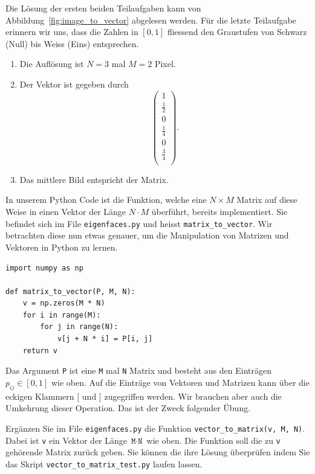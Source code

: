\begin{losung*}
	Die Lösung der ersten beiden Teilaufgaben kann von Abbildung~\ref{fig:image_to_vector} abgelesen werden.
	Für die letzte Teilaufgabe erinnern wir uns, dass die Zahlen in $\left[0,1\right]$ fliessend den Graustufen von Schwarz (Null) bis Weiss (Eins) entsprechen.
	\begin{enumerate}[label=(\alph*)]
		\item Die Auflösung ist $N=3$ mal $M=2$ Pixel.
		\item Der Vektor ist gegeben durch
		\begin{equation*}
			\begin{pmatrix}
				1 \\
				\frac{1}{2} \\
				0 \\
				\frac{1}{4} \\
				0 \\
				\frac{3}{4} \\
			\end{pmatrix}.
		\end{equation*}
		\item Das mittlere Bild entspricht der Matrix.
	\end{enumerate}
\end{losung*}
In unserem Python Code ist die Funktion, welche eine $N\times M$ Matrix auf diese Weise in einen Vektor der Länge $N\cdot M$ überführt, bereits implementiert.
Sie befindet sich im File \texttt{eigenfaces.py} und heisst \texttt{matrix\_to\_vector}.
Wir betrachten diese nun etwas genauer, um die Manipulation von Matrizen und Vektoren in Python zu lernen.
\begin{lstlisting}[style=python]
import numpy as np

def matrix_to_vector(P, M, N):
	v = np.zeros(M * N)
	for i in range(M):
		for j in range(N):
			v[j + N * i] = P[i, j]
	return v
\end{lstlisting}
Das Argument \texttt{P} ist eine  \texttt{M} mal \texttt{N} Matrix und besteht aus den Einträgen $p_{ij}\in\left[0,1\right]$ wie oben.
Auf die Einträge von Vektoren und Matrizen kann über die eckigen Klammern $[$ und $]$ zugegriffen werden.
Wir brauchen aber auch die Umkehrung dieser Operation.
Das ist der Zweck folgender Übung.
\begin{aufgabe}
	Ergänzen Sie im File \texttt{eigenfaces.py} die Funktion \texttt{vector\_to\_matrix(v, M, N)}.
	Dabei ist \texttt{v} ein Vektor der Länge $\texttt{M}\cdot\texttt{N}$ wie oben.
	Die Funktion soll die zu \texttt{v} gehörende Matrix zurück geben.
	Sie können die ihre Lösung überprüfen indem Sie das Skript \texttt{vector\_to\_matrix\_test.py} laufen lassen.
\end{aufgabe}
